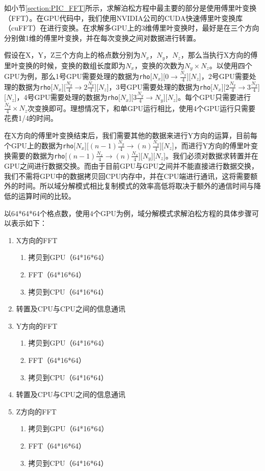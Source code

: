如小节\ref{section:PIC_FFT}所示，求解泊松方程中最主要的部分是使用傅里叶变换（FFT）。在GPU代码中，我们使用NVIDIA公司的CUDA快速傅里叶变换库（cuFFT）\cite{nvidia2010cufft}在进行变换。在求解多GPU上的3维傅里叶变换时，最好是在三个方向分别做1维的傅里叶变换，并在每次变换之间对数据进行转置。

假设在X，Y，Z三个方向上的格点数分别为$N_x$，$N_y$，$N_z$，那么当执行X方向的傅里叶变换的时候，变换的数组长度即为$N_x$，变换的次数为$N_y \times N_z$。以使用四个GPU为例，那么1号GPU需要处理的数据为\verb'rho'[$N_x$][$0 \rightarrow \frac{N_y}{4}$][$N_z$]，2号GPU需要处理的数据为\verb'rho'[$N_x$][$\frac{N_y}{4} \rightarrow 2\frac{N_y}{4}$][$N_z$]，3号GPU需要处理的数据为\verb'rho'[$N_x$][$2\frac{N_y}{4}\rightarrow 3\frac{N_y}{4}$][$N_z$]，4号GPU需要处理的数据为\verb'rho'[$N_x$][$3\frac{N_y}{4}\rightarrow N_y$][$N_z$]。每个GPU只需要进行$\frac{N_y}{4} \times N_z$次变换即可。理想情况下，和单GPU运行相比，使用4个GPU运行只需要花费1/4的时间。

在X方向的傅里叶变换结束后，我们需要其他的数据来进行Y方向的运算，目前每个GPU上的数据为\verb'rho'[$N_x$][$(n-1)\frac{N_y}{4}\rightarrow (n)\frac{N_y}{4}$][$N_z$]，而进行Y方向的傅里叶变换需要的数据为\verb'rho'[$(n-1)\frac{N_x}{4}\rightarrow (n)\frac{N_x}{4}$][$N_y$][$N_z$]。我们必须对数据求转置并在GPU之间进行数据交换。而由于目前GPU与GPU之间并不能直接进行数据交换，我们不需将GPU中的数据拷贝回CPU内存中，并在CPU端进行通讯，这将需要额外的时间。所以域分解模式相比复制模式的效率高低将取决于额外的通信时间与降低的运算时间的比较。

以64*64*64个格点数，使用4个GPU为例，域分解模式求解泊松方程的具体步骤可以表示如下：
\begin{enumerate}
  \item X方向的FFT
  \begin{enumerate}
    \item 拷贝到GPU（64*16*64）
    \item FFT（64*16*64）
    \item 拷贝到CPU（64*16*64）
  \end{enumerate}
  \item 转置及CPU与CPU之间的信息通讯
  \item Y方向的FFT
  \begin{enumerate}
    \item 拷贝到GPU（64*16*64）
    \item FFT（64*16*64）
    \item 拷贝到CPU（64*16*64）
  \end{enumerate}
  \item 转置及CPU与CPU之间的信息通讯
  \item Z方向的FFT
  \begin{enumerate}
    \item 拷贝到GPU（64*16*64）
    \item FFT（64*16*64）
    \item 拷贝到CPU（64*16*64）
  \end{enumerate}
\end{enumerate}

